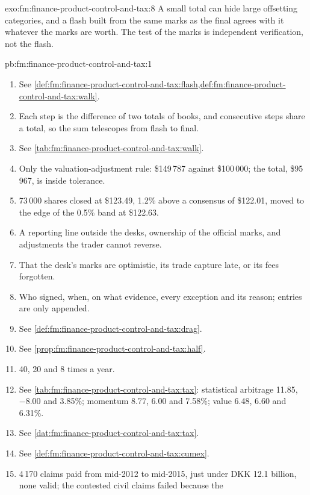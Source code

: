 \begin{solution}{exo:fm:finance-product-control-and-tax:8}
A small total can hide large offsetting categories, and a flash built from the same marks as the final agrees with it whatever the marks are worth.
The test of the marks is independent verification, not the flash.
\end{solution}

\begin{solution}{pb:fm:finance-product-control-and-tax:1}
\begin{enumerate}
\item See \cref{def:fm:finance-product-control-and-tax:flash,def:fm:finance-product-control-and-tax:walk}.
\item Each step is the difference of two totals of books, and consecutive steps share a total, so the sum telescopes from flash to final.
\item See \cref{tab:fm:finance-product-control-and-tax:walk}.
\item Only the valuation-adjustment rule: \$149\,787 against \$100\,000; the total, \$95\,967, is inside tolerance.
\item 73\,000 shares closed at \$123.49, 1.2\% above a consensus of \$122.01, moved to the edge of the 0.5\% band at \$122.63.
\item A reporting line outside the desks, ownership of the official marks, and adjustments the trader cannot reverse.
\item That the desk's marks are optimistic, its trade capture late, or its fees forgotten.
\item Who signed, when, on what evidence, every exception and its reason; entries are only appended.
\item See \cref{def:fm:finance-product-control-and-tax:drag}.
\item See \cref{prop:fm:finance-product-control-and-tax:half}.
\item 40, 20 and 8 times a year.
\item See \cref{tab:fm:finance-product-control-and-tax:tax}: statistical arbitrage 11.85, $-8.00$ and 3.85\%; momentum 8.77, 6.00 and 7.58\%; value
6.48, 6.60 and 6.31\%.
\item See \cref{dat:fm:finance-product-control-and-tax:tax}.
\item See \cref{def:fm:finance-product-control-and-tax:cumex}.
\item 4\,170 claims paid from mid-2012 to mid-2015, just under DKK 12.1 billion, none valid; the contested civil claims failed because the

\end{enumerate}
\end{solution}
